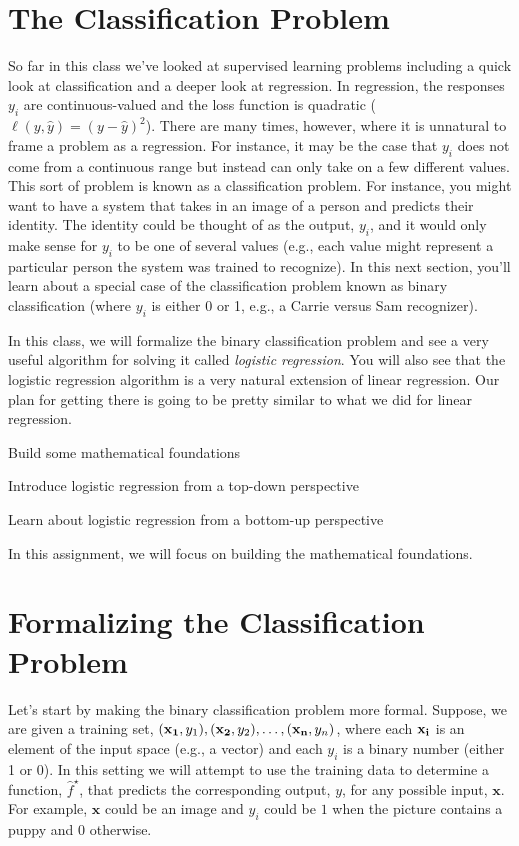 \documentclass[assignment03_Solutions]{subfiles}
\begin{document}
\section{The Classification Problem}

So far in this class we've looked at supervised learning problems including a quick look at classification and a deeper look at regression. In regression, the responses $y_i$ are continuous-valued and the loss function is quadratic ($\ell(y, \hat{y}) = (y-\hat{y})^2$).  There are many times, however, where it is unnatural to frame a problem as a regression.  For instance, it may be the case that $y_i$ does not come from a continuous range but instead can only take on a few different values.  This sort of problem is known as a classification problem.  For instance, you might want to have a system that takes in an image of a person and predicts their identity.  The identity could be thought of as the output, $y_i$, and it would only make sense for $y_i$ to be one of several values (e.g., each value might represent a particular person the system was trained to recognize).  In this next section, you'll learn about a special case of the classification problem known as binary classification (where $y_i$ is either 0 or 1, e.g., a Carrie versus Sam recognizer).

In this class, we will formalize the binary classification problem and see a very useful algorithm for solving it called \emph{logistic regression}.  You will also see that the logistic regression algorithm is a very natural extension of linear regression.  Our plan for getting there is going to be pretty similar to what we did for linear regression.
\bi
\item Build some mathematical foundations
\item Introduce logistic regression from a top-down perspective
\item Learn about logistic regression from a bottom-up perspective
\ei

In this assignment, we will focus on building the mathematical foundations.

\section{Formalizing the Classification Problem}
Let's start by making the binary classification problem more formal.  Suppose, we are given a training set, $(\mathbf{x_1}, y_1), (\mathbf{x_2}, y_2), \ldots, (\mathbf{x_n}, y_n)$, where each $\mathbf{x_i}$ is an element of the input space (e.g., a vector) and each $y_i$ is a binary number (either 1 or 0).  In this setting we will attempt to use the training data to determine a function, $\hat{f}^\star$, that predicts the corresponding output, $y$, for any possible input, $\mathbf{x}$.  For example,  $\mathbf{x}$ could be an image and $y_i$ could be $1$ when the picture contains a puppy and $0$ otherwise.
\end{document}
